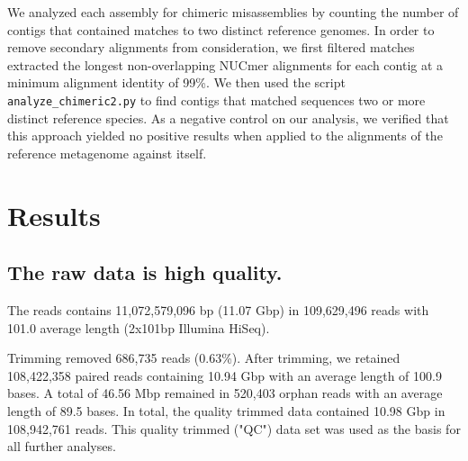 \documentclass[10pt,a4paper,twocolumn]{article}
\begin{document}

We analyzed each assembly for chimeric misassemblies by counting the
number of contigs that contained matches to two distinct reference
genomes.  In order to remove secondary alignments from consideration,
we first filtered matches extracted the longest non-overlapping NUCmer
alignments for each contig at a minimum alignment identity of 99\%.
We then used the script {\tt analyze\_chimeric2.py} to find contigs
that matched sequences two or more distinct reference species.  As a
negative control on our analysis, we verified that this approach
yielded no positive results when applied to the alignments of the
reference metagenome against itself.




\section*{Results}

\subsection*{The raw data is high quality.}

The reads contains 11,072,579,096 bp (11.07 Gbp) in 109,629,496 reads
with 101.0 average length (2x101bp Illumina HiSeq).

Trimming removed 686,735 reads (0.63\%).  After trimming, we retained
108,422,358 paired reads containing 10.94 Gbp with an average length of
100.9 bases. A total of 46.56 Mbp remained in 520,403 orphan reads with
an average length of 89.5 bases. In total, the quality trimmed data
contained 10.98 Gbp in 108,942,761 reads.  This quality trimmed ("QC")
data set was used as the basis for all further analyses.
\end{document}
